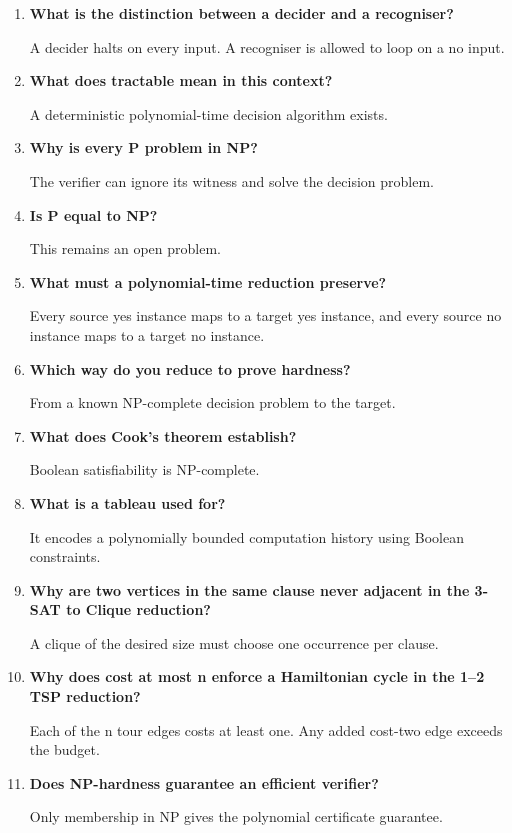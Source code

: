 \documentclass[12pt,a4paper]{article}
\newcommand{\Q}[1]{\textbf{#1}\par\noindent\ignorespaces}
\begin{document}
\begin{tcolorbox}[exambox, title={Frequently Asked / Viva Questions}]
\begin{enumerate}[topsep=0pt, label=\textbf{Q\arabic*.}, itemsep=5pt, leftmargin=*]
  \item \Q{What is the distinction between a decider and a recogniser?}
    A decider halts on every input. A recogniser is allowed to loop on a no input.
  \item \Q{What does tractable mean in this context?}
    A deterministic polynomial-time decision algorithm exists.
  \item \Q{Why is every P problem in NP?}
    The verifier can ignore its witness and solve the decision problem.
  \item \Q{Is P equal to NP?}
    This remains an open problem.
  \item \Q{What must a polynomial-time reduction preserve?}
    Every source yes instance maps to a target yes instance, and every source no instance maps to a target no instance.
  \item \Q{Which way do you reduce to prove hardness?}
    From a known NP-complete decision problem to the target.
  \item \Q{What does Cook's theorem establish?}
    Boolean satisfiability is NP-complete.
  \item \Q{What is a tableau used for?}
    It encodes a polynomially bounded computation history using Boolean constraints.
  \item \Q{Why are two vertices in the same clause never adjacent in the 3-SAT to Clique reduction?}
    A clique of the desired size must choose one occurrence per clause.
  \item \Q{Why does cost at most n enforce a Hamiltonian cycle in the 1--2 TSP reduction?}
    Each of the n tour edges costs at least one. Any added cost-two edge exceeds the budget.
  \item \Q{Does NP-hardness guarantee an efficient verifier?}
    Only membership in NP gives the polynomial certificate guarantee.
\end{enumerate}
\end{tcolorbox}
\end{document}
